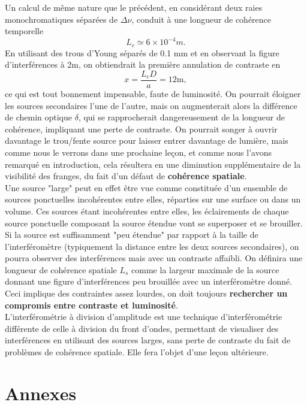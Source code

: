 \documentclass[11pt,a4paper]{report}
\begin{document}
Un calcul de même nature que le précédent, en considérant deux raies monochromatiques séparées de $\Delta\nu$, conduit à une longueur de cohérence temporelle
\begin{equation}
	L_c \simeq 6\times 10^{-4} m.
\end{equation}
En utilisant des trous d'Young séparés de 0.1 mm et en observant la figure d'interférences à 2m, on obtiendrait la première annulation de contraste en 
\begin{equation}
	x = \frac{L_c D}{a} = 12 \text{m},
\end{equation}
ce qui est tout bonnement impensable, faute de luminosité. On pourrait éloigner les sources secondaires l'une de l'autre, mais on augmenterait alors la différence de chemin optique $\delta$, qui se rapprocherait dangereusement de la longueur de cohérence, impliquant une perte de contraste. On pourrait songer à ouvrir davantage le trou/fente source pour laisser entrer davantage de lumière, mais comme nous le verrons dans une prochaine leçon, et comme nous l'avons remarqué en introduction, cela résultera en une diminution supplémentaire de la visibilité des franges, du fait d'un défaut de \textbf{cohérence spatiale}.\\

Une source "large" peut en effet être vue comme constituée d'un ensemble de sources ponctuelles incohérentes entre elles, réparties sur une surface ou dans un volume. Ces sources étant incohérentes entre elles, les éclairements de chaque source ponctuelle composant la source étendue vont se superposer et se brouiller. Si la source est suffisamment "peu étendue" par rapport à la taille de l'interféromètre (typiquement la distance entre les deux sources secondaires), on pourra observer des interférences mais avec un contraste affaibli. On définira une longueur de cohérence spatiale $L_s$ comme la largeur maximale de la source donnant une figure d'interférences peu brouillée avec un interféromètre donné. Ceci implique des contraintes assez lourdes, on doit toujours \textbf{rechercher un compromis entre contraste et luminosité}.\\ 

L'interférométrie à division d'amplitude est une technique d'interférométrie différente de celle à division du front d'ondes, permettant de visualiser des interférences en utilisant des sources larges, sans perte de contraste du fait de problèmes de cohérence spatiale. Elle fera l'objet d'une leçon ultérieure.

\newpage
\section*{Annexes}
\end{document}
